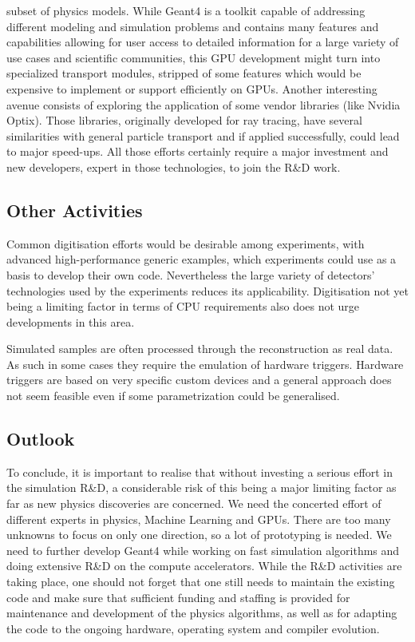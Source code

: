 \documentclass[11pt,a4paper]{article}
\begin{document}
subset of physics models. While Geant4 is a toolkit capable of
addressing different modeling and simulation problems and contains many
features and capabilities allowing for user access to detailed
information for a large variety of use cases and scientific communities,
this GPU development might turn into specialized transport modules,
stripped of some features which would be expensive to implement or
support efficiently on GPUs. Another interesting avenue consists of
exploring the application of some vendor libraries (like Nvidia Optix).
Those libraries, originally developed for ray tracing, have several
similarities with general particle transport and if applied
successfully, could lead to major speed-ups. All those efforts certainly
require a major investment and new developers, expert in those
technologies, to join the R\&D work.

\hypertarget{other-activities}{%
\subsection{Other Activities}\label{other-activities}}

Common digitisation efforts would be desirable among experiments, with
advanced high-performance generic examples, which experiments could use
as a basis to develop their own code. Nevertheless the large variety of
detectors' technologies used by the experiments reduces its
applicability. Digitisation not yet being a limiting factor in terms of
CPU requirements also does not urge developments in this area.

Simulated samples are often processed through the reconstruction as real
data. As such in some cases they require the emulation of hardware
triggers. Hardware triggers are based on very specific custom devices
and a general approach does not seem feasible even if some
parametrization could be generalised.

\hypertarget{outlook}{%
\subsection{Outlook}\label{outlook}}

To conclude, it is important to realise that without investing a serious
effort in the simulation R\&D, a considerable risk of this being a major
limiting factor as far as new physics discoveries are concerned. We need
the concerted effort of different experts in physics, Machine Learning
and GPUs. There are too many unknowns to focus on only one direction, so
a lot of prototyping is needed. We need to further develop Geant4 while
working on fast simulation algorithms and doing extensive R\&D on the
compute accelerators. While the R\&D activities are taking place, one
should not forget that one still needs to maintain the existing code and
make sure that sufficient funding and staffing is provided for
maintenance and development of the physics algorithms, as well as for
adapting the code to the ongoing hardware, operating system and compiler
evolution.
\end{document}
